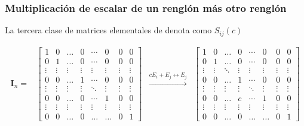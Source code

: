 \documentclass[
]{article}
\begin{document}
\hypertarget{multiplicaciuxf3n-de-escalar-de-un-rengluxf3n-muxe1s-otro-rengluxf3n}{%
\subsubsection{Multiplicación de escalar de un renglón más otro
renglón}\label{multiplicaciuxf3n-de-escalar-de-un-rengluxf3n-muxe1s-otro-rengluxf3n}}

La tercera clase de matrices elementales de denota como \(S_{ij}(c)\)

\begin{equation*}
\begin{array}{ccccc}
\mathbf{I}_n = &  \begin{bmatrix} 
                   1      & 0     & \ldots  & 0     & \cdots& 0      & 0       & 0      \\ 
                   0      & 1     & \ldots  & 0     & \cdots& 0      & 0       & 0      \\
                \vdots    & \vdots& \vdots  & \vdots& \vdots& \vdots & \vdots  & \vdots \\
                   0      &  0    & \ldots  & 1     & \cdots& 0      & 0       & 0      \\
                \vdots    & \vdots& \vdots  & \vdots& \ddots& \vdots& \vdots  & \vdots \\
                   0      &  0    & \ldots  & 0     & \cdots& 1      & 0       & 0      \\
                \vdots    & \vdots& \vdots  & \vdots& \vdots& \vdots & \vdots  & \vdots \\   
                  0       &  0    & \ldots  & 0     & \ldots& \ldots & 0      & 1
  \end{bmatrix}
 & \xrightarrow{ cE_i+E_j\leftrightarrow E_j}
 &  \begin{bmatrix} 
                   1      & 0     & \ldots  & 0     & \cdots& 0      & 0       & 0      \\ 
                   0      & 1     & \ldots  & 0     & \cdots& 0      & 0       & 0      \\
                \vdots    & \vdots& \ddots  & \vdots& \vdots& \vdots & \vdots  & \vdots \\
                   0      &  0    & \ldots  & 1     & \cdots& 0      & 0       & 0      \\
                \vdots    & \vdots& \vdots  & \vdots& \ddots& \vdots& \vdots  & \vdots \\
                   0      &  0    & \ldots  & c     & \cdots& 1      & 0       & 0      \\
                \vdots    & \vdots& \vdots  & \vdots& \vdots& \vdots & \vdots  & \vdots \\   
                  0       &  0    & \ldots  & 0     & \ldots& \ldots & 0      & 1
  \end{bmatrix}
\end{array}
\end{equation*}
\end{document}
